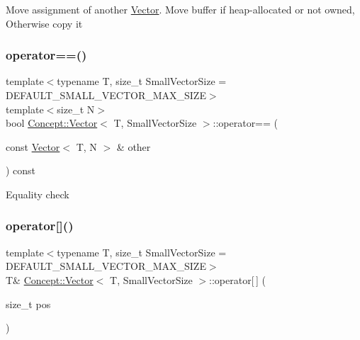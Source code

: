 Move assignment of another \mbox{\hyperlink{class_concept_1_1_vector}{Vector}}. Move buffer if heap-\/allocated or not owned, Otherwise copy it \mbox{\label{class_concept_1_1_vector_a62f543e01ccc500d04e85a70b81bbfb2}} 
\subsubsection{\texorpdfstring{operator==()}{operator==()}}
{\footnotesize\ttfamily template$<$typename T, size\+\_\+t Small\+Vector\+Size = D\+E\+F\+A\+U\+L\+T\+\_\+\+S\+M\+A\+L\+L\+\_\+\+V\+E\+C\+T\+O\+R\+\_\+\+M\+A\+X\+\_\+\+S\+I\+ZE$>$ \\
template$<$size\+\_\+t N$>$ \\
bool \mbox{\hyperlink{class_concept_1_1_vector}{Concept\+::\+Vector}}$<$ T, Small\+Vector\+Size $>$\+::operator== (\begin{DoxyParamCaption}\item[{const \mbox{\hyperlink{class_concept_1_1_vector}{Vector}}$<$ T, N $>$ \&}]{other }\end{DoxyParamCaption}) const\hspace{0.3cm}{\ttfamily [inline]}}

Equality check \mbox{\label{class_concept_1_1_vector_adb9742c5303dcae29b2b0bc933f52dec}} 
\subsubsection{\texorpdfstring{operator[]()}{operator[]()}\hspace{0.1cm}{\footnotesize\ttfamily [1/2]}}
{\footnotesize\ttfamily template$<$typename T, size\+\_\+t Small\+Vector\+Size = D\+E\+F\+A\+U\+L\+T\+\_\+\+S\+M\+A\+L\+L\+\_\+\+V\+E\+C\+T\+O\+R\+\_\+\+M\+A\+X\+\_\+\+S\+I\+ZE$>$ \\
T\& \mbox{\hyperlink{class_concept_1_1_vector}{Concept\+::\+Vector}}$<$ T, Small\+Vector\+Size $>$\+::operator\mbox{[}$\,$\mbox{]} (\begin{DoxyParamCaption}\item[{size\+\_\+t}]{pos }\end{DoxyParamCaption})\hspace{0.3cm}{\ttfamily [inline]}}

